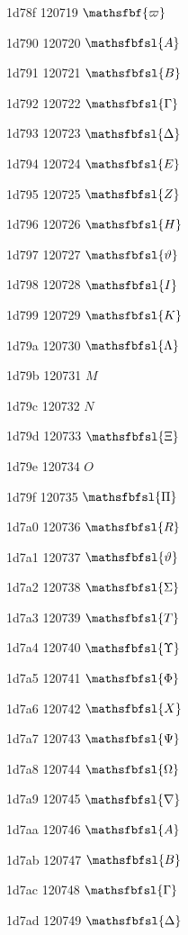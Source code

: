 \documentclass[11pt]{article}
\begin{document}
1d78f 120719 \ensuremath{\mathsfbf{\varpi}}

1d790 120720 \ensuremath{\mathsfbfsl{{A}}}

1d791 120721 \ensuremath{\mathsfbfsl{{B}}}

1d792 120722 \ensuremath{\mathsfbfsl{\Gamma}}

1d793 120723 \ensuremath{\mathsfbfsl{\Delta}}

1d794 120724 \ensuremath{\mathsfbfsl{{E}}}

1d795 120725 \ensuremath{\mathsfbfsl{{Z}}}

1d796 120726 \ensuremath{\mathsfbfsl{{H}}}

1d797 120727 \ensuremath{\mathsfbfsl{\vartheta}}

1d798 120728 \ensuremath{\mathsfbfsl{{I}}}

1d799 120729 \ensuremath{\mathsfbfsl{{K}}}

1d79a 120730 \ensuremath{\mathsfbfsl{\Lambda}}

1d79b 120731 \ensuremath{M}

1d79c 120732 \ensuremath{N}

1d79d 120733 \ensuremath{\mathsfbfsl{\Xi}}

1d79e 120734 \ensuremath{O}

1d79f 120735 \ensuremath{\mathsfbfsl{\Pi}}

1d7a0 120736 \ensuremath{\mathsfbfsl{{R}}}

1d7a1 120737 \ensuremath{\mathsfbfsl{\vartheta}}

1d7a2 120738 \ensuremath{\mathsfbfsl{\Sigma}}

1d7a3 120739 \ensuremath{\mathsfbfsl{{T}}}

1d7a4 120740 \ensuremath{\mathsfbfsl{\Upsilon}}

1d7a5 120741 \ensuremath{\mathsfbfsl{\Phi}}

1d7a6 120742 \ensuremath{\mathsfbfsl{{X}}}

1d7a7 120743 \ensuremath{\mathsfbfsl{\Psi}}

1d7a8 120744 \ensuremath{\mathsfbfsl{\Omega}}

1d7a9 120745 \ensuremath{\mathsfbfsl{\nabla}}

1d7aa 120746 \ensuremath{\mathsfbfsl{{A}}}

1d7ab 120747 \ensuremath{\mathsfbfsl{{B}}}

1d7ac 120748 \ensuremath{\mathsfbfsl{\Gamma}}

1d7ad 120749 \ensuremath{\mathsfbfsl{\Delta}}
\end{document}
